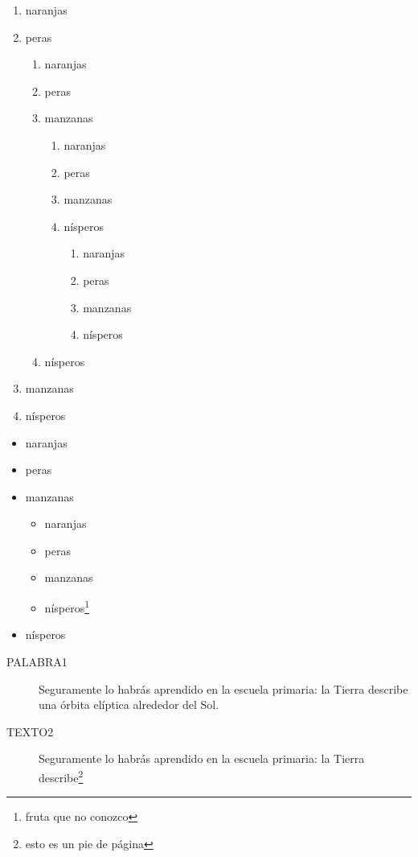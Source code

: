 \documentclass{report}
\begin{document}
\begin{enumerate}
\item naranjas
\item peras
\begin{enumerate}
	\item naranjas
	\item peras
	\item manzanas
	\begin{enumerate}
		\item naranjas
		\item peras
		\item manzanas
		\item nísperos
		\begin{enumerate}
			\item naranjas
			\item peras
			\item manzanas
			\item nísperos
		\end{enumerate}
	\end{enumerate}
	\item nísperos
\end{enumerate}
\item manzanas
\item nísperos
\end{enumerate}

\begin{itemize}
	\item naranjas
\item peras
\item manzanas
\begin{itemize}
	\item naranjas
	\item peras
	\item manzanas
	\item nísperos\footnote{fruta que no conozco}
\end{itemize}
\item nísperos
\end{itemize}

\begin{description}
\item[PALABRA1] Seguramente lo habrás aprendido en la escuela primaria: la Tierra describe una órbita elíptica alrededor del Sol.

\item[TEXTO2] Seguramente lo habrás aprendido en la escuela primaria: la Tierra describe\footnote{esto es un pie de página}
\end{description}
\end{document}
